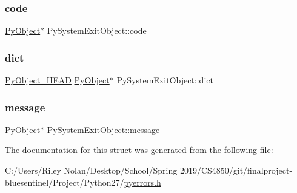 \mbox{\label{struct_py_system_exit_object_a24b939fdbc4152b8f08dcd2fc08cc08b}} 
\subsubsection{\texorpdfstring{code}{code}}
{\footnotesize\ttfamily \mbox{\hyperlink{_python27_2object_8h_aadc84ac7aed2cfa6f20c25f62bf3dac7}{Py\+Object}}$\ast$ Py\+System\+Exit\+Object\+::code}

\mbox{\label{struct_py_system_exit_object_af813e336ff6727fccce5ba305adaf03d}} 
\subsubsection{\texorpdfstring{dict}{dict}}
{\footnotesize\ttfamily \mbox{\hyperlink{_python27_2object_8h_a0bf35c1f3ea13f925de94d8593db3b7e}{Py\+Object\+\_\+\+H\+E\+AD}} \mbox{\hyperlink{_python27_2object_8h_aadc84ac7aed2cfa6f20c25f62bf3dac7}{Py\+Object}}$\ast$ Py\+System\+Exit\+Object\+::dict}

\mbox{\label{struct_py_system_exit_object_a1de85ccb4b5ea71dbeb918ff34e37792}} 
\subsubsection{\texorpdfstring{message}{message}}
{\footnotesize\ttfamily \mbox{\hyperlink{_python27_2object_8h_aadc84ac7aed2cfa6f20c25f62bf3dac7}{Py\+Object}}$\ast$ Py\+System\+Exit\+Object\+::message}



The documentation for this struct was generated from the following file\+:\begin{DoxyCompactItemize}
\item 
C\+:/\+Users/\+Riley Nolan/\+Desktop/\+School/\+Spring 2019/\+C\+S4850/git/finalproject-\/bluesentinel/\+Project/\+Python27/\mbox{\hyperlink{pyerrors_8h}{pyerrors.\+h}}\end{DoxyCompactItemize}
